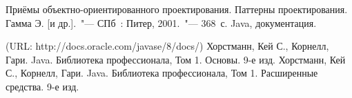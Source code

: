\renewcommand{\bibname}{Список использованных источников}
\begin{thebibliography}{9}
 Приёмы объектно-ориентированного проектирования. Паттерны проектирования. Гамма Э. [и др.].~"--- СПб~: Питер, 2001.~"--- 368~с.
 Java, документация.\par
(URL: http://docs.oracle.com/javase/8/docs/)
 Хорстманн, Кей С., Корнелл, Гари. Java. Библиотека профессионала, Том 1. Основы. 9-е изд.
 Хорстманн, Кей С., Корнелл, Гари. Java. Библиотека профессионала, Том 1. Расширенные средства. 9-е изд.
\end{thebibliography}